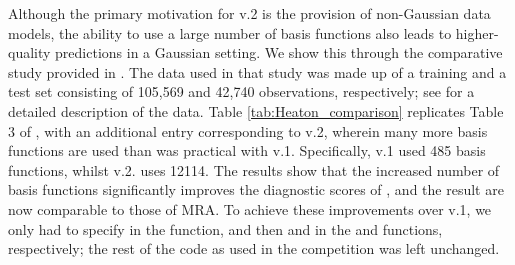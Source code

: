 \documentclass[nojss]{jss}
\newcommand{\red}[1]{\textcolor{red}{#1}}
\newcommand{\fct}[1]{\code{#1()}}
\begin{document}
Although the primary motivation for  v.2 is the provision of non-Gaussian data models, the ability to use  a large number of basis functions also leads to higher-quality predictions in a Gaussian setting.
We show this through the comparative study provided in \cite{Heaton_2019_comparative_study}.
The data used in that study was made up of a training and a test set consisting of 105,569 and 42,740 observations, respectively; see \cite{Heaton_2019_comparative_study} for a detailed description of the data.
Table \ref{tab:Heaton_comparison} replicates Table 3 of \cite{Heaton_2019_comparative_study}, with an additional entry corresponding to  v.2, wherein many more basis functions are used than was practical with  v.1.
 Specifically,  v.1 used 485 basis functions, whilst  v.2. uses 12114.
The results show that the increased number of basis functions significantly improves the diagnostic scores of , and the result are now comparable to those of MRA. 
To achieve these improvements over  v.1, we only had to specify  in the \fct{auto\_basis} function, and then  and  in the \fct{SRE} and \fct{SRE.fit} functions, respectively; the rest of the  code as used in the competition was left unchanged. 




%
%
\end{document}
